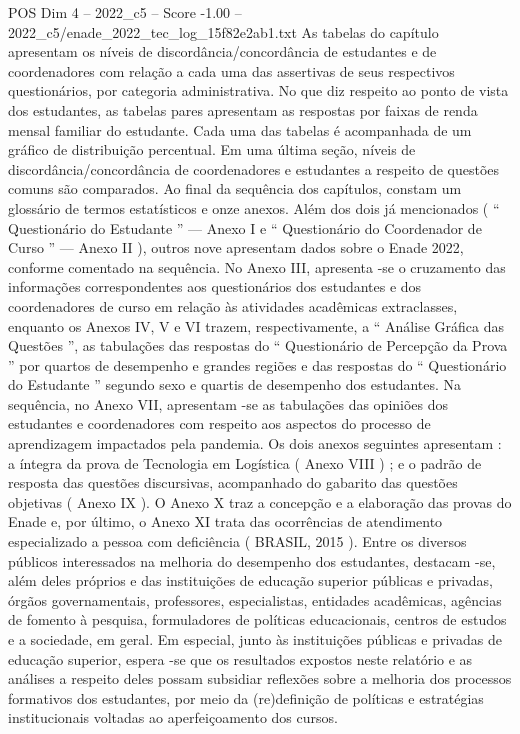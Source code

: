 \begin{textsample}{POS Dim 4 – 2022\_c5 – Score -1.00 – 2022\_c5/enade\_2022\_tec\_log\_15f82e2ab1.txt}
As tabelas do capítulo apresentam os níveis de discordância/concordância de estudantes e de coordenadores com relação a cada uma das assertivas de seus respectivos questionários, por categoria administrativa.
No que diz respeito ao ponto de vista dos estudantes, as tabelas pares apresentam as respostas por faixas de renda mensal familiar do estudante.
Cada uma das tabelas é acompanhada de um gráfico de distribuição percentual.
Em uma última seção, níveis de discordância/concordância de coordenadores e estudantes a respeito de questões comuns são comparados.
Ao final da sequência dos capítulos, constam um glossário de termos estatísticos e onze anexos.
Além dos dois já mencionados ( “ Questionário do Estudante ” — Anexo I e “ Questionário do Coordenador de Curso ” — Anexo II ), outros nove apresentam dados sobre o Enade 2022, conforme comentado na sequência.
No Anexo III, apresenta -se o cruzamento das informações correspondentes aos questionários dos estudantes e dos coordenadores de curso em relação às atividades acadêmicas extraclasses, enquanto os Anexos IV, V e VI trazem, respectivamente, a “ Análise Gráfica das Questões ”, as tabulações das respostas do “ Questionário de Percepção da Prova ” por quartos de desempenho e grandes regiões e das respostas do “ Questionário do Estudante ” segundo sexo e quartis de desempenho dos estudantes.
Na sequência, no Anexo VII, apresentam -se as tabulações das opiniões dos estudantes e coordenadores com respeito aos aspectos do processo de aprendizagem impactados pela pandemia.
Os dois anexos seguintes apresentam : a íntegra da prova de Tecnologia em Logística ( Anexo VIII ) ; e o padrão de resposta das questões discursivas, acompanhado do gabarito das questões objetivas ( Anexo IX ).
O Anexo X traz a concepção e a elaboração das provas do Enade e, por último, o Anexo XI trata das ocorrências de atendimento especializado a pessoa com deficiência ( BRASIL, 2015 ).
Entre os diversos públicos interessados na melhoria do desempenho dos estudantes, destacam -se, além deles próprios e das instituições de educação superior públicas e privadas, órgãos governamentais, professores, especialistas, entidades acadêmicas, agências de fomento à pesquisa, formuladores de políticas educacionais, centros de estudos e a sociedade, em geral.
Em especial, junto às instituições públicas e privadas de educação superior, espera -se que os resultados expostos neste relatório e as análises a respeito deles possam subsidiar reflexões sobre a melhoria dos processos formativos dos estudantes, por meio da (re)definição de políticas e estratégias institucionais voltadas ao aperfeiçoamento dos cursos.

\end{textsample}

